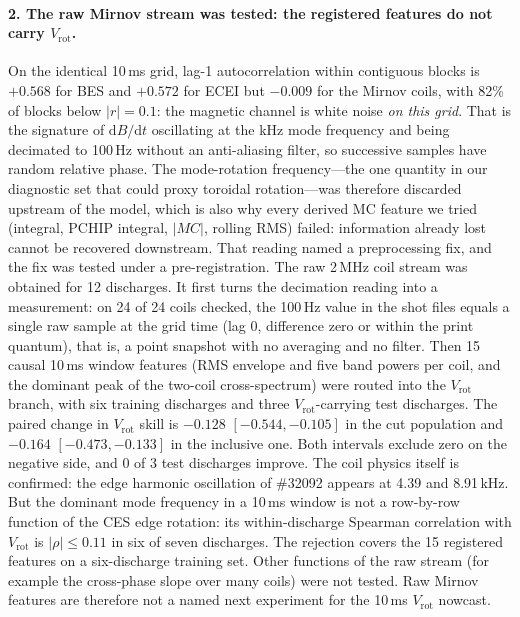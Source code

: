 \documentclass[10pt]{article}
\newcommand{\Vrot}{\ensuremath{V_\mathrm{rot}}}
\begin{document}
\paragraph{2. The raw Mirnov stream was tested: the registered features do not carry
\Vrot{}.} On the identical 10\,ms grid, lag-1 autocorrelation
within contiguous blocks is $+0.568$ for BES and $+0.572$ for ECEI but $-0.009$ for
the Mirnov coils, with 82\% of blocks below $|r| = 0.1$: the magnetic channel is
white noise \emph{on this grid}. That is the signature of $\mathrm{d}B/\mathrm{d}t$
oscillating at the kHz mode frequency and being decimated to 100\,Hz without an
anti-aliasing filter, so successive samples have random relative phase. The
mode-rotation frequency---the one quantity in our diagnostic set that could proxy
toroidal rotation---was therefore discarded upstream of the model, which is also why
every derived MC feature we tried (integral, PCHIP integral, $|MC|$, rolling RMS)
failed: information already lost cannot be recovered downstream. That reading named
a preprocessing fix, and the fix was tested under a pre-registration. The raw
2\,MHz coil stream was obtained for 12 discharges. It first turns the decimation
reading into a measurement: on 24 of 24 coils checked, the 100\,Hz value in the shot
files equals a single raw sample at the grid time (lag 0, difference zero or within
the print quantum), that is, a point snapshot with no averaging and no filter. Then
15 causal 10\,ms window
features (RMS envelope and five band powers per coil, and the dominant peak of the
two-coil cross-spectrum) were routed into the \Vrot{} branch, with six training
discharges and three \Vrot{}-carrying test discharges. The paired change in \Vrot{}
skill is $-0.128$ $[-0.544, -0.105]$ in the cut population and $-0.164$
$[-0.473, -0.133]$ in the inclusive one. Both intervals exclude zero on the negative
side, and 0 of 3 test discharges improve. The coil physics itself is confirmed: the
edge harmonic oscillation of \#32092 appears at 4.39 and 8.91\,kHz. But the dominant
mode frequency in a 10\,ms window is not a row-by-row function of the CES edge
rotation: its within-discharge Spearman correlation with \Vrot{} is $|\rho| \leq 0.11$
in six of seven discharges. The rejection covers the 15 registered features on a
six-discharge training set. Other functions of the raw stream (for example the
cross-phase slope over many coils) were not tested. Raw Mirnov features are
therefore not a named next experiment for the 10\,ms \Vrot{} nowcast.
\end{document}
